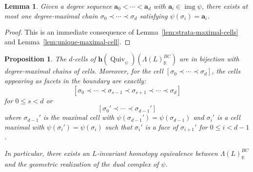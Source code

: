 \documentclass{amsart}
\newcommand{\RR}{\mathbb{R}}
\newcommand{\homotopy}{\mathbf{h}}
\DeclareMathOperator{\img}{img}
\newcommand{\Quiv}{\operatorname{Quiv}}
\newtheorem{proposition}[theorem]{Proposition}
\newtheorem{lemma}[theorem]{Lemma}
\theoremstyle{remark}
\begin{document}
\begin{lemma}
  \label{lem:unique-degree-maximal}
  Given a degree sequence $\bm{a}_0<\cdots<\bm{a}_d$ with $\bm{a}_i\in \img \psi$, there exists at most one degree-maximal chain $\sigma_0\prec \cdots \prec \sigma_d$ satisfying $\psi(\sigma_i) = \bm{a}_i$.
\end{lemma}
\begin{proof}
  This is an immediate consequence of Lemma~\ref{lem:strata-maximal-cells} and Lemma~\ref{lem:unique-maximal-cell}.
\end{proof}

\begin{proposition}
  \label{prop:boundary-and-homotopy}
  The $d$-cells of $\homotopy(\Quiv_\psi)(\Lambda(L)_{\RR}^{BC})$ are in bijection with degree-maximal chains of cells. Moreover, for the cell $[\sigma_0\prec \cdots \prec \sigma_d]$, the cells appearing as facets in the boundary are exactly:
  \[
    [\sigma_0\prec \cdots \prec \sigma_{s-1}\prec \sigma_{s+1}\prec \cdots \prec \sigma_d]
    \]
    for $0\leq s < d$ or
    \[
    [\sigma_0'\prec \cdots \prec \sigma_{d-1}']
    \]
  where $\sigma_{d-1}'$ is the maximal cell with $\psi(\sigma_{d-1}')=\psi(\sigma_{d-1})$ and  $\sigma_{i}'$ is a cell maximal with $\psi(\sigma_{i}')=\psi(\sigma_{i})$ such that $\sigma_i'$ is a face of $\sigma_{i+1}'$ for $0\leq i <d-1$.

  In particular, there exists an $L$-invariant homotopy equivalence between $\Lambda(L)_{\RR}^{BC}$ and the geometric realization of the dual complex of $\psi$.
\end{proposition}
\end{document}
